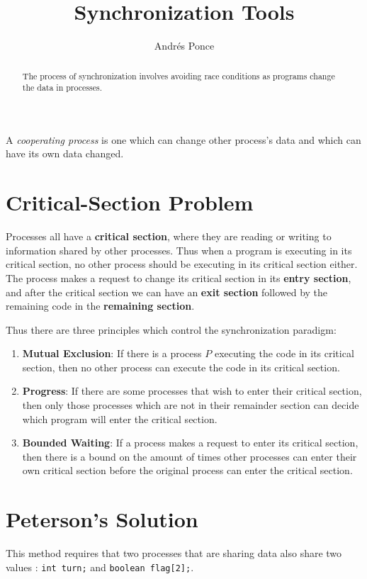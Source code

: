 \documentclass{tufte-handout}
\author{Andr\'es Ponce}
\title{Synchronization Tools}
\begin{document}
\maketitle
\begin{abstract}
The process of synchronization involves avoiding race conditions as programs 
change the data in processes.
\end{abstract}

A \textit{cooperating process} is one which can change other process's data and which 
can have its own data changed.

\section{Critical-Section Problem}
Processes all have a \textbf{critical section}, where they are reading or writing to information
shared by other processes. Thus when a program is executing in its critical section, no other
process should be executing in its critical section either. The process makes a request to 
change its critical section in its \textbf{entry section}, and after the critical section
we can have an \textbf{exit section} followed by the remaining code in the \textbf{remaining
section}.

Thus there are three principles which control the synchronization paradigm:
\begin{enumerate}
	\item{\textbf{Mutual Exclusion}: If there is a process $P$ executing the code in its
		critical section, then no other process can execute the code in its critical section.}
	\item{\textbf{Progress}: If there are some processes that wish to enter their critical 
		section, then only those processes which are not in their remainder section can decide 
		which program will enter the critical section.}
	\item{\textbf{Bounded Waiting}: If a process makes a request to enter its critical section,
		then there is a bound on the amount of times other processes can enter their own critical
		section before the original process can enter the critical section.}
\end{enumerate}

\section{Peterson's Solution}

This method requires that two processes that are sharing data also share two values :
\texttt{int turn;} and \texttt{boolean flag[2];}.
\end{document}
